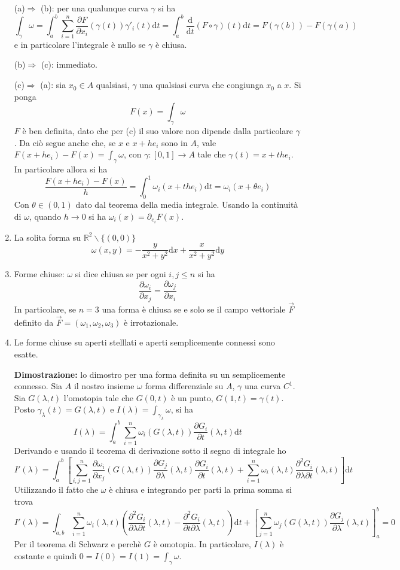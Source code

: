 \documentclass[a4paper,11pt]{article}
\begin{document}
\begin{enumerate}
	(a)$\Rightarrow$ (b): per una qualunque curva $\gamma$ si ha
	\[\int_{\gamma}\omega=\int_{a}^{b}\sum_{i=1}^{n}\frac{\partial F}{\partial x_i}(\gamma(t))\gamma'_i(t)\mathrm{d}t=\int_{a}^{b}\frac{\mathrm{d}}{\mathrm{d}t}(F\circ\gamma)(t)\mathrm{d}t=F(\gamma(b))-F(\gamma(a))\]
	e in particolare l'integrale è nullo se $\gamma$ è chiusa.
	
	(b)$\Rightarrow$ (c): immediato.
	
	(c)$\Rightarrow$ (a): sia $x_0\in A$ qualsiasi, $\gamma$ una qualsiasi curva che congiunga $x_0$ a $x$. Si ponga
	\[F(x)=\int_{\gamma}\omega\]
	$F$ è ben definita, dato che per (c) il suo valore non dipende dalla particolare $\gamma$. Da ciò segue anche che, se $x$ e $x+he_i$ sono in $A$, vale $F(x+he_i)-F(x)=\int_{\gamma}\omega$, con $\gamma\colon[0,1]\to A$ tale che $\gamma(t)=x+the_i$. In particolare allora si ha
	\[\frac{F(x+he_i)-F(x)}{h}=\int_{0}^{1}\omega_i(x+the_i)\mathrm{d}t=\omega_i(x+\theta e_i)\]
	Con $\theta\in(0,1)$ dato dal teorema della media integrale. Usando la continuità di $\omega$, quando $h\to0$ si ha
	$\omega_i(x)=\partial_{e_i}F(x)$.
	
	\item La solita forma su $\mathbb{R}^2\backslash\{(0,0)\}$
	\[\omega(x,y)=-\frac{y}{x^2+y^2}\mathrm{d}x+\frac{x}{x^2+y^2}\mathrm{d}y\]
	\item Forme chiuse: $\omega$ si dice chiusa se per ogni $i,j\leq n$ si ha
	\[\frac{\partial \omega_i}{\partial x_j}=\frac{\partial \omega_j}{\partial x_i}\]
	In particolare, se $n=3$ una forma è chiusa se e solo se il campo vettoriale $\vec{F}$ definito da $\vec{F}=(\omega_1,\omega_2,\omega_3)$ è irrotazionale.
	\item Le forme chiuse su aperti stelllati e aperti semplicemente connessi sono esatte.
	
	\textbf{Dimostrazione:} lo dimostro per una forma definita su un semplicemente connesso. Sia $A$ il nostro insieme $\omega$ forma differenziale su $A$, $\gamma$ una curva $C^1$. Sia $G(\lambda,t)$ l'omotopia tale che $G(0,t)$ è un punto, $G(1,t)=\gamma(t)$. Posto $\gamma_\lambda(t)=G(\lambda,t)$ e $I(\lambda)=\int_{\gamma_\lambda}\omega$, si ha
	\[I(\lambda)=\int_{a}^{b}\sum_{i=1}^{n}\omega_i(G(\lambda,t))\frac{\partial G_i}{\partial t}(\lambda,t)\mathrm{d}t\]
	Derivando e usando il teorema di derivazione sotto il segno di integrale ho
	\[I'(\lambda)=\int_{a}^{b}\left[\sum_{i,j=1}^{n}\frac{\partial \omega_i}{\partial x_j}(G(\lambda,t))\frac{\partial G_j}{\partial \lambda}(\lambda,t)\frac{\partial G_i}{\partial t}(\lambda,t)+\sum_{i=1}^{n}\omega_i(\lambda,t)\frac{\partial^2G_i}{\partial\lambda\partial t}(\lambda,t)\right]\mathrm{d}t\]
	Utilizzando il fatto che $\omega$ è chiusa e integrando per parti la prima somma si trova
	\[I'(\lambda)=\int_{a,b}\sum_{i=1}^{n}\omega_i(\lambda,t)\left(\frac{\partial^2G_i}{\partial\lambda\partial t}(\lambda,t)-\frac{\partial^2G_i}{\partial t\partial \lambda}(\lambda,t)\right)\mathrm{d}t+\left[\sum_{j=1}^{n}\omega_j(G(\lambda,t))\frac{\partial G_j}{\partial \lambda}(\lambda,t)\right]_{a}^b=0\]
	Per il teorema di Schwarz e perchè $G$ è omotopia. In particolare, $I(\lambda)$ è costante e quindi $0=I(0)=I(1)=\int_{\gamma}\omega$.
	

\end{enumerate}
\end{document}
